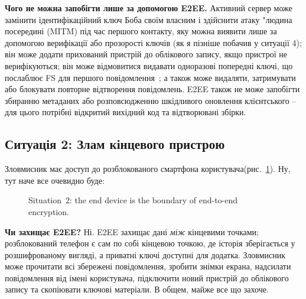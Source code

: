 \textbf{Чого не можна запобігти лише за допомогою E2EE.} Активний сервер може замінити ідентифікаційний ключ Боба 
своїм власним і здійснити атаку "людина посередині{} (MITM) під час першого контакту, яку можна виявити лише за 
допомогою верифікації або прозорості ключів (як я пізніше побачив у ситуації 4); він може додати прихований пристрій 
до облікового запису, якщо пристрої не верифікуються; він може відмовитися видавати одноразові попередні ключі, 
що послаблює FS для першого повідомлення~\cite{signal_x3dh}; а також може видаляти, затримувати або блокувати 
повторне відтворення повідомлень. E2EE також не може запобігти збиранню метаданих або розповсюдженню шкідливого 
оновлення клієнтського -- для цього потрібні відкритий вихідний код та відтворювані збірки.

\subsection{Ситуація 2: Злам кінцевого пристрою}
\label{sec:s2}

Зловмисник має доступ до розблокованого смартфона користувача(рис.~\ref{fig:s2}). Ну, тут наче все очевидно буде:

\begin{figure}[H]
    \centering
    \caption{Situation~2: the end device is the boundary of end-to-end encryption.}
    \label{fig:s2}
\end{figure}

\textbf{Чи захищає E2EE?} Ні. E2EE захищає дані \textit{між} кінцевими точками; розблокований телефон є сам по собі 
кінцевою точкою, де історія зберігається у розшифрованому вигляді, а приватні ключі доступні для додатка. Зловмисник 
може прочитати всі збережені повідомлення, зробити знімки екрана, надсилати повідомлення від імені користувача, 
підключити новий пристрій до облікового запису та скопіювати ключові матеріали. В общем, майже все що захоче.

